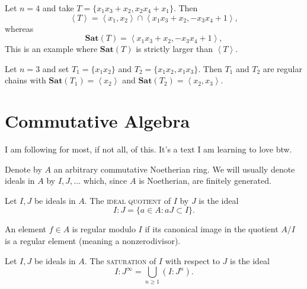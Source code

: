 \documentclass[12pt]{article}
\newcommand{\Emph}[1]{\textsc{#1}}
\begin{document}
\begin{example}  
Let $n=4$ and take $T=\{x_1x_3+x_2,x_2x_4+x_1\}$.  Then 
\[
\left<T\right>=\left<x_1,x_2\right>\cap\left<x_1x_3+x_2,-x_3x_4+1\right>,
\]
whereas
\[
\textbf{Sat}(T)=\left<x_1x_3+x_2,-x_3x_4+1\right>,
\]
This is an example where $\textbf{Sat}(T)$ is strictly larger than $\left<T\right>$.
\end{example}

\begin{example}  
Let $n=3$ and set $T_1 = \{x_1x_2\}$ and $T_2 = \{x_1x_2,x_1x_3\}$.  Then $T_1$ and $T_2$ are regular chains with $\textbf{Sat}(T_1)=\left<x_2\right>$ and $\textbf{Sat}(T_2) = \left<x_2,x_3\right>$.
\end{example}

\section*{Commutative Algebra}

{\color{red} I am following \cite{V98} for most, if not all, of this.  It's a text I am learning to love btw.}

\begin{notation}
Denote by $A$ an arbitrary commutative Noetherian ring.  We will usually denote ideals in $A$ by $I, J, \ldots$ which, since $A$ is Noetherian, are finitely generated.
\end{notation}

\begin{definition}
Let $I, J$ be ideals in $A$.  The \Emph{ideal quotient} of $I$ by $J$ is the ideal
\[
I:J=\{a \in A : aJ\subset I\}.
\]
\end{definition}

\begin{definition}
An element $f\in A$ is regular modulo $I$ if its canonical image in the quotient $A/I$ is a regular element (meaning a nonzerodivisor).
\end{definition}


\begin{definition}[saturation]
Let $I, J$ be ideals in $A$.  The \Emph{saturation} of $I$ with respect to $J$ is the ideal
\[
I:J^\infty=\bigcup_{n \geq 1}(I:J^n).
\]
\end{definition}
\end{document}
